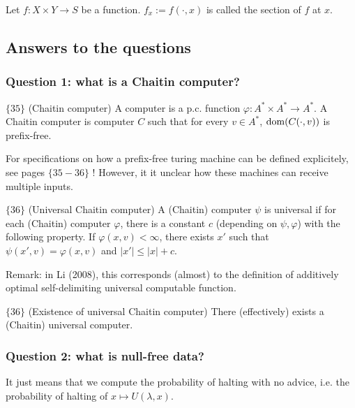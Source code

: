 \documentclass{article}
\begin{document}
\begin{definition}
    Let $f : X \times Y \to S$ be a function. $f_x := f(\cdot,x)$ is called the section of $f$ at $x$.
\end{definition}
\begin{lemma}
    
\end{lemma}


\subsection{Answers to the questions}


\subsubsection{Question 1: what is a Chaitin computer?}
\begin{definition} $\{35\}$ (Chaitin computer)
    A computer is a p.c. function $\varphi : A^\ast \times A^\ast \to A^\ast$. A Chaitin computer is computer $C$ such that for every $v \in A^\ast$, $\operatorname{dom} (C(\cdot,v))$ is prefix-free.
\end{definition}

For specifications on how a prefix-free turing machine can be defined explicitely, see pages $\{35-36\}$ ! However, it it unclear how these machines can receive multiple inputs.

\begin{definition} $\{36\}$ (Universal Chaitin computer)
    A (Chaitin) computer $\psi$ is universal if for each (Chaitin) computer $\varphi$, there is a constant $c$ (depending on $\psi,\varphi$) with the following property. If $\varphi(x,v) < \infty$, there exists $x'$ such that $\psi(x',v) = \varphi(x,v)$ and $|x'| \leq |x| + c$.
\end{definition}
Remark: in Li (2008), this corresponds (almost) to the definition of additively optimal self-delimiting universal computable function.

\begin{theorem} $\{36\}$ (Existence of universal Chaitin computer)
    There (effectively) exists a (Chaitin) universal computer.
\end{theorem}

\subsubsection{ Question 2: what is null-free data?}

It just means that we compute the probability of halting with no advice, i.e. the probability of halting of $x \mapsto U(\lambda, x)$.
\end{document}
